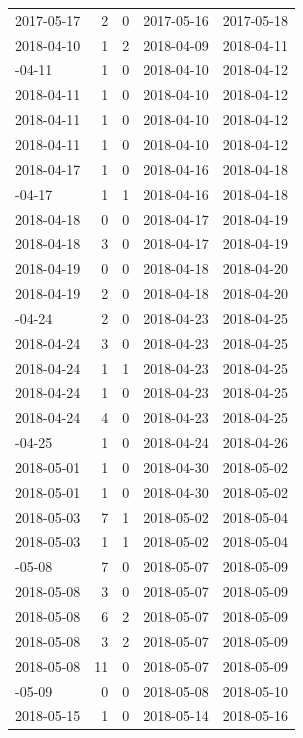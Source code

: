 \documentclass[
]{article}
\begin{document}
\begin{longtable}{lrrll}
2017-05-17 & 2 & 0 & 2017-05-16 & 2017-05-18\\
2018-04-10 & 1 & 2 & 2018-04-09 & 2018-04-11\\
\addlinespace
2018-04-11 & 1 & 0 & 2018-04-10 & 2018-04-12\\
2018-04-11 & 1 & 0 & 2018-04-10 & 2018-04-12\\
2018-04-11 & 1 & 0 & 2018-04-10 & 2018-04-12\\
2018-04-11 & 1 & 0 & 2018-04-10 & 2018-04-12\\
2018-04-17 & 1 & 0 & 2018-04-16 & 2018-04-18\\
\addlinespace
2018-04-17 & 1 & 1 & 2018-04-16 & 2018-04-18\\
2018-04-18 & 0 & 0 & 2018-04-17 & 2018-04-19\\
2018-04-18 & 3 & 0 & 2018-04-17 & 2018-04-19\\
2018-04-19 & 0 & 0 & 2018-04-18 & 2018-04-20\\
2018-04-19 & 2 & 0 & 2018-04-18 & 2018-04-20\\
\addlinespace
2018-04-24 & 2 & 0 & 2018-04-23 & 2018-04-25\\
2018-04-24 & 3 & 0 & 2018-04-23 & 2018-04-25\\
2018-04-24 & 1 & 1 & 2018-04-23 & 2018-04-25\\
2018-04-24 & 1 & 0 & 2018-04-23 & 2018-04-25\\
2018-04-24 & 4 & 0 & 2018-04-23 & 2018-04-25\\
\addlinespace
2018-04-25 & 1 & 0 & 2018-04-24 & 2018-04-26\\
2018-05-01 & 1 & 0 & 2018-04-30 & 2018-05-02\\
2018-05-01 & 1 & 0 & 2018-04-30 & 2018-05-02\\
2018-05-03 & 7 & 1 & 2018-05-02 & 2018-05-04\\
2018-05-03 & 1 & 1 & 2018-05-02 & 2018-05-04\\
\addlinespace
2018-05-08 & 7 & 0 & 2018-05-07 & 2018-05-09\\
2018-05-08 & 3 & 0 & 2018-05-07 & 2018-05-09\\
2018-05-08 & 6 & 2 & 2018-05-07 & 2018-05-09\\
2018-05-08 & 3 & 2 & 2018-05-07 & 2018-05-09\\
2018-05-08 & 11 & 0 & 2018-05-07 & 2018-05-09\\
\addlinespace
2018-05-09 & 0 & 0 & 2018-05-08 & 2018-05-10\\
2018-05-15 & 1 & 0 & 2018-05-14 & 2018-05-16\\

\end{longtable}
\end{document}
